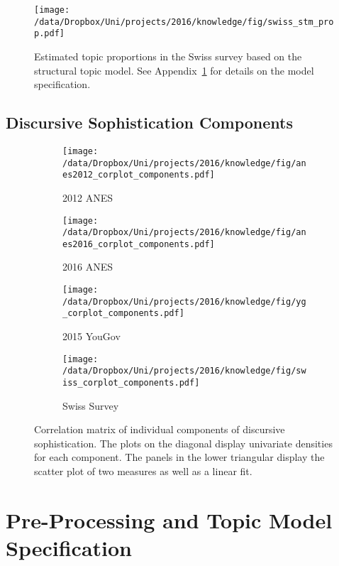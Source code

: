 \begin{figure}[h]\centering
\texttt{[image: /data/Dropbox/Uni/projects/2016/knowledge/fig/swiss\_stm\_prop.pdf]}
\caption[Estimated topic proportions in the Swiss survey based on the structural topic model]{Estimated topic proportions in the Swiss survey based on the structural topic model. See Appendix~\ref{app:topicmodel} for details on the model specification.}\label{fig:swiss_stm_prop}
\end{figure}


\clearpage
\subsection{Discursive Sophistication Components}
\begin{figure*}[h]
    \centering
    \begin{subfigure}[h]{0.4\textwidth}
        \centering
        \texttt{[image: /data/Dropbox/Uni/projects/2016/knowledge/fig/anes2012\_corplot\_components.pdf]}
        \caption{2012 ANES}
    \end{subfigure}%
    \begin{subfigure}[h]{0.4\textwidth}
         \centering
         \texttt{[image: /data/Dropbox/Uni/projects/2016/knowledge/fig/anes2016\_corplot\_components.pdf]}
         \caption{2016 ANES}
    \end{subfigure}%
    
    \begin{subfigure}[h]{0.4\textwidth}
        \centering
        \texttt{[image: /data/Dropbox/Uni/projects/2016/knowledge/fig/yg\_corplot\_components.pdf]}
        \caption{2015 YouGov}
    \end{subfigure}%
    \begin{subfigure}[h]{0.4\textwidth}
         \centering
         \texttt{[image: /data/Dropbox/Uni/projects/2016/knowledge/fig/swiss\_corplot\_components.pdf]}
         \caption{Swiss Survey}
    \end{subfigure}
    \caption[Correlation matrix of individual components of discursive sophistication.]{Correlation matrix of individual components of discursive sophistication. The plots on the diagonal display univariate densities for each component. The panels in the lower triangular display the scatter plot of two measures as well as a linear fit. %
     }\label{fig:components}
\end{figure*}


\clearpage
\section{Pre-Processing and Topic Model Specification}\label{app:topicmodel}

